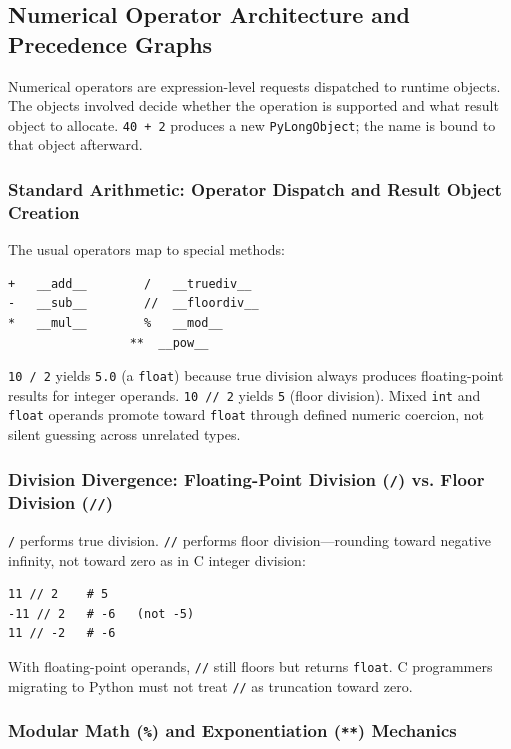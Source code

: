 \subsection{Numerical Operator Architecture and Precedence Graphs}

Numerical operators are expression-level requests dispatched to runtime objects. The objects involved decide whether the operation is supported and what result object to allocate. \texttt{40 + 2} produces a new \texttt{PyLongObject}; the name is bound to that object afterward.

\subsubsection{Standard Arithmetic: Operator Dispatch and Result Object Creation}

The usual operators map to special methods:

\begin{verbatim}
+   __add__        /   __truediv__
-   __sub__        //  __floordiv__
*   __mul__        %   __mod__
                 **  __pow__
\end{verbatim}

\texttt{10 / 2} yields \texttt{5.0} (a \texttt{float}) because true division always produces floating-point results for integer operands. \texttt{10 // 2} yields \texttt{5} (floor division). Mixed \texttt{int} and \texttt{float} operands promote toward \texttt{float} through defined numeric coercion, not silent guessing across unrelated types.

\subsubsection{Division Divergence: Floating-Point Division (\texttt{/}) vs. Floor Division (\texttt{//})}

\texttt{/} performs true division. \texttt{//} performs floor division---rounding toward negative infinity, not toward zero as in C integer division:

\begin{verbatim}
11 // 2    # 5
-11 // 2   # -6   (not -5)
11 // -2   # -6
\end{verbatim}

With floating-point operands, \texttt{//} still floors but returns \texttt{float}. C programmers migrating to Python must not treat \texttt{//} as truncation toward zero.

\subsubsection{Modular Math (\texttt{\%}) and Exponentiation (\texttt{**}) Mechanics}

